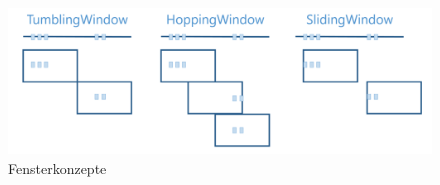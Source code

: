\begin{figure}[h!]
	\centering
	\includegraphics[width=1.0\linewidth]{images/fensterfunktionen}
	\caption{Fensterkonzepte} %
	\label{fig:window_concepts}
\end{figure}
 